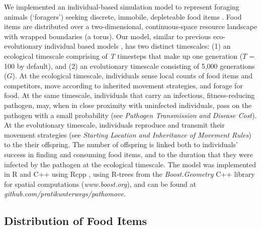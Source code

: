 We implemented an individual-based simulation model to represent foraging animals (`foragers') seeking discrete, immobile, depleteable food items \citep[as in][see \textit{Supplementary Material Fig. 1 -- 2}]{spiegel2017,gupte2021a}.
Food items are distributed over a two-dimensional, continuous-space resource landscape with wrapped boundaries (a torus).
Our model, similar to previous eco-evolutionary individual based models \citep{getz2015, netz2021, gupte2021a}, has two distinct timescales: (1) an ecological timescale comprising of \textit{T} timesteps that make up one generation ($T$ = 100 by default), and (2) an evolutionary timescale consisting of 5,000 generations ($G$).
At the ecological timescale, individuals sense local counts of food items and competitors, move according to inherited movement strategies, and forage for food.
At the same timescale, individuals that carry an infectious, fitness-reducing pathogen, may, when in close proximity with uninfected individuals, pass on the pathogen with a small probability (see \textit{Pathogen Transmission and Disease Cost}).
At the evolutionary timescale, individuals reproduce and transmit their movement strategies (see \textit{Starting Location and Inheritance of Movement Rules}) to the their offspring. The number of offspring is linked both to individuals' success in finding and consuming food items, and to the duration that they were infected by the pathogen at the ecological timescale.
The model was implemented in R and C++ using Rcpp \citep{rcoreteam2020,eddelbuettel2013}, using R-trees from the \textit{Boost.Geometry} C++ library for spatial computations (\textit{www.boost.org}), and can be found at \textit{github.com/pratikunterwegs/pathomove}.

\subsection*{Distribution of Food Items}

